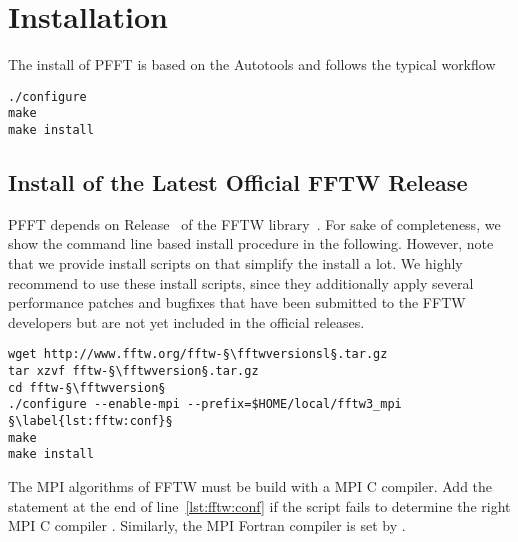 \chapter{Installation}\label{chap:inst}

The install of PFFT is based on the Autotools and follows the typical workflow
\begin{lstlisting}[escapechar=§]
./configure
make
make install
\end{lstlisting}


\section{Install of the Latest Official FFTW Release}\label{sec:fftw_inst}
PFFT depends on Release~\fftwversion{} of the FFTW library~\cite{fftw}.
For sake of completeness, we show the command line based install procedure in the following.
However, note that we provide install scripts on \websoft that simplify the install a lot.
We highly recommend to use these install scripts, since they additionally apply several
performance patches and bugfixes that have been submitted to the FFTW developers but
are not yet included in the official releases.
\begin{lstlisting}[escapechar=§]
wget http://www.fftw.org/fftw-§\fftwversionsl§.tar.gz
tar xzvf fftw-§\fftwversion§.tar.gz
cd fftw-§\fftwversion§
./configure --enable-mpi --prefix=$HOME/local/fftw3_mpi §\label{lst:fftw:conf}§
make
make install
\end{lstlisting}
The MPI algorithms of FFTW must be build with a MPI C compiler. Add the statement 
at the end of line~\ref{lst:fftw:conf} if the  script fails to determine the right
MPI C compiler . Similarly, the MPI Fortran compiler  is set by .

